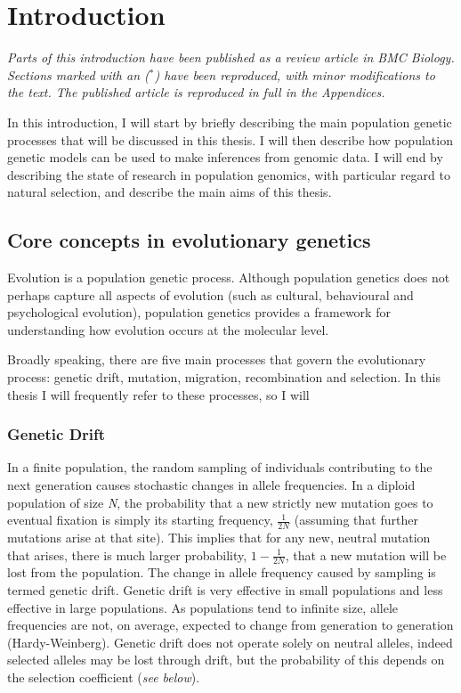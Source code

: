 \chapter{Introduction}

\textit{Parts of this introduction have been published as a review article in BMC Biology. Sections marked with an ($ ^*$) have been reproduced, with minor modifications to the text. The published article is reproduced in full in the Appendices. 
}

In this introduction, I will start by briefly describing the main population genetic processes that will be discussed in this thesis. I will then describe how population genetic models can be used to make inferences from genomic data. I will end by describing the state of research in population genomics, with particular regard to natural selection, and describe the main aims of this thesis.

\section[Core concepts]{Core concepts in evolutionary genetics}

Evolution is a population genetic process. Although population genetics does not perhaps capture all aspects of evolution (such as cultural, behavioural and psychological evolution), population genetics provides a framework for understanding how evolution occurs at the molecular level.

Broadly speaking, there are five main processes that govern the evolutionary process: genetic drift, mutation, migration, recombination and selection. In this thesis I will frequently refer to these processes, so I will 

\subsection{Genetic Drift}

	In a finite population, the random sampling of individuals contributing to the next generation causes stochastic changes in allele frequencies. In a diploid population of size \textit{N}, the probability that a new strictly new mutation goes to eventual fixation is simply its starting frequency, $\frac{1}{2N}$ (assuming that further mutations arise at that site). This implies that for any new, neutral mutation that arises, there is much larger probability, $1 - \frac{1}{2N}$, that a new mutation will be lost from the population. The change in allele frequency caused by sampling is termed genetic drift. Genetic drift is very effective in small populations and less effective in large populations. As populations tend to infinite size, allele frequencies are not, on average, expected to change from generation to generation (Hardy-Weinberg). Genetic drift does not operate solely on neutral alleles, indeed selected alleles may be lost through drift, but the probability of this depends on the selection coefficient (\textit{see below}).
	
